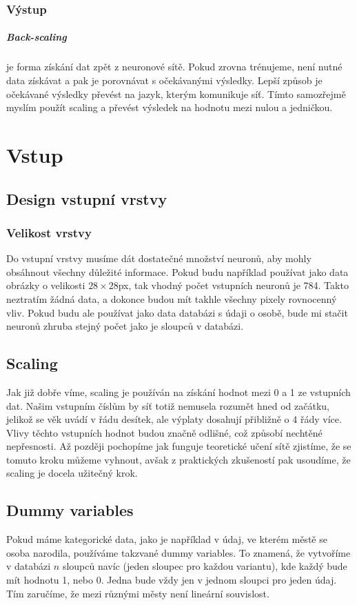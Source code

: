 \documentclass[12pt,a4paper]{report}
\begin{document}
	\subsection{Výstup}
		\paragraph{Back-scaling}
		je forma získání dat zpět z neuronové sítě. Pokud zrovna trénujeme, není nutné data získávat a pak je porovnávat s očekávanými výsledky. Lepší způsob je očekávané výsledky převést na jazyk, kterým komunikuje síť. Tímto samozřejmě myslím použít scaling a převést výsledek na hodnotu mezi nulou a jedničkou.
	
\chapter{Vstup}
	\section{Design vstupní vrstvy}
		\subsection{Velikost vrstvy}
		Do vstupní vrstvy musíme dát dostatečné množství neuronů, aby mohly obsáhnout všechny důležité informace. Pokud budu například používat jako data obrázky o velikosti $28\times 28$px, tak vhodný počet vstupních neuronů je 784. Takto neztratím žádná data, a dokonce budou mít takhle všechny pixely rovnocenný vliv. Pokud budu ale používat jako data databázi s údaji o osobě, bude mi stačit neuronů zhruba stejný počet jako je sloupců v databázi.
	\section{Scaling}
	Jak již dobře víme, scaling je používán na získání hodnot mezi 0 a 1 ze vstupních dat. Našim vstupním číslům by síť totiž nemusela rozumět hned od začátku, jelikož se věk uvádí v řádu desítek, ale výplaty dosahují přibližně o 4 řády více. Vlivy těchto vstupních hodnot budou značně odlišné, což způsobí nechtěné nepřesnosti. Až později pochopíme jak funguje teoretické učení sítě zjistíme, že se tomuto kroku můžeme vyhnout, avšak z praktických zkušeností pak usoudíme, že scaling je docela užitečný krok.
	\section{Dummy variables}
	Pokud máme kategorické data, jako je například v údaj, ve kterém městě se osoba narodila, používáme takzvané dummy variables. To znamená, že vytvoříme v databázi $n$ sloupců navíc (jeden sloupec pro každou variantu), kde každý bude mít hodnotu 1, nebo 0. Jedna bude vždy jen v jednom sloupci pro jeden údaj. Tím zaručíme, že mezi různými městy není lineární souvislost.
	
\end{document}
